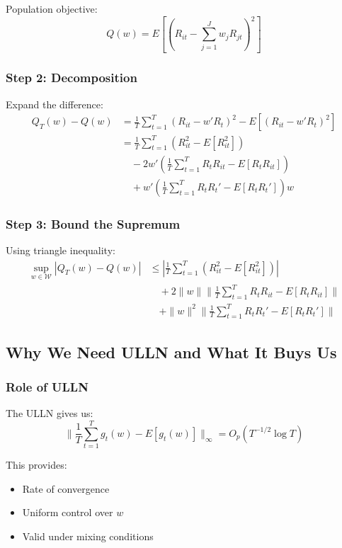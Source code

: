 \documentclass[12pt,article]{memoir}
\begin{document}
Population objective:
\begin{equation}
    Q(w) = E[(R_{it} - \sum_{j=1}^J w_jR_{jt})^2]
\end{equation}

\subsubsection{Step 2: Decomposition}

Expand the difference:
\begin{align}
    Q_T(w) - Q(w) &= \frac{1}{T}\sum_{t=1}^T (R_{it} - w'R_{t})^2 - E[(R_{it} - w'R_{t})^2] \\
    &= \frac{1}{T}\sum_{t=1}^T (R_{it}^2 - E[R_{it}^2]) \\
    &\quad - 2w'\left(\frac{1}{T}\sum_{t=1}^T R_{t}R_{it} - E[R_{t}R_{it}]\right) \\
    &\quad + w'\left(\frac{1}{T}\sum_{t=1}^T R_{t}R_{t}' - E[R_{t}R_{t}']\right)w
\end{align}

\subsubsection{Step 3: Bound the Supremum}

Using triangle inequality:
\begin{align}
    \sup_{w \in \mathcal{W}} |Q_T(w) - Q(w)| &\leq |\frac{1}{T}\sum_{t=1}^T (R_{it}^2 - E[R_{it}^2])| \\
    &\quad + 2\|w\| \|\frac{1}{T}\sum_{t=1}^T R_{t}R_{it} - E[R_{t}R_{it}]\| \\
    &\quad + \|w\|^2 \|\frac{1}{T}\sum_{t=1}^T R_{t}R_{t}' - E[R_{t}R_{t}']\|
\end{align}

\subsection{Why We Need ULLN and What It Buys Us}

\subsubsection{Role of ULLN}

The ULLN gives us:
\begin{equation}
    \|\frac{1}{T}\sum_{t=1}^T g_t(w) - E[g_t(w)]\|_{\infty} = O_p(T^{-1/2}\log T)
\end{equation}

This provides:
\begin{itemize}
    \item Rate of convergence
    \item Uniform control over $w$
    \item Valid under mixing conditions
\end{itemize}
\end{document}

